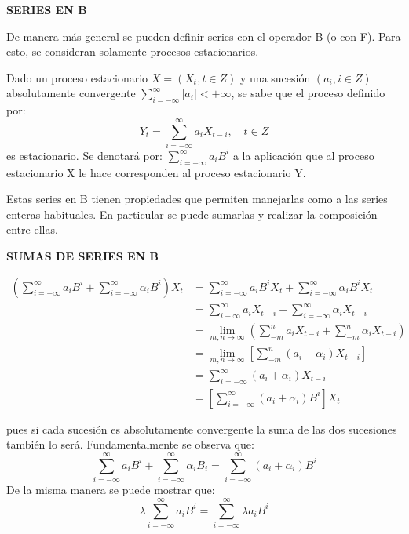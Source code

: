 \textbf{SERIES EN B}\newline

De manera m\'{a}s general se pueden definir series con el operador B (o con F). Para esto, se consideran solamente procesos estacionarios.\newline

Dado un proceso estacionario $X=\left(X_{t}, t\in Z \right)$ y una sucesi\'{o}n $\left(a_{i}, i\in Z \right)$ absolutamente convergente $\sum_{i=-\infty }^\infty \left|a_{i}\right| <+\infty$, se sabe que el proceso definido por:
\[
Y_{t} =\sum\limits_{i=-\infty }^\infty a_{i} X_{t-i},\quad t\in Z
\]
es estacionario. Se denotar\'{a} por: $\sum\limits_{i=-\infty}^{\infty} a_{i} B^{i}$ a la aplicaci\'{o}n que al proceso estacionario X le hace corresponden al proceso estacionario Y.\newline

Estas series en B tienen propiedades que permiten manejarlas como a las series enteras habituales. En particular se puede sumarlas y realizar la composici\'{o}n entre ellas.\newline

\textbf{SUMAS DE SERIES EN B}

\begin{align*}
\left(\sum\limits_{i=-\infty}^{\infty} a_{i}B^{i}+\sum\limits_{i=-\infty}^{\infty} \alpha_{i} B^{i} \right)X_{t} &=\sum\limits_{i=-\infty }^{\infty} a_{i}B^{i} X_{t} +\sum\limits_{i=-\infty}^{\infty} \alpha_{i}B^{i}X_{t}\\
      &= \sum\limits_{i-\infty}^{\infty} a_{i} X_{t-i} +\sum\limits_{i=-\infty}^{\infty} \alpha_{i} X_{t-i}\\
      &= \lim\limits_{m,n\to \infty} \left(\sum\limits_{-m}^{n} a_{i}X_{t-i} +\sum\limits_{-m}^{n} \alpha_{i} X_{t-i} \right) \\ 
      &= \lim\limits_{m,n\to \infty} \left[\sum\limits_{-m}^{n} \left(a_{i} +\alpha_{i} \right)X_{t-i}\right] \\ 
      &= \sum\limits_{i=-\infty}^{\infty} \left(a_{i} +\alpha_{i} \right)X_{t-i} \\ 
      &= \left[\sum\limits_{i=-\infty}^{\infty} \left( a_{i} +\alpha_{i}\right)B^{i} \right]X_{t}
\end{align*}

pues si cada sucesi\'{o}n es absolutamente convergente la suma de las dos sucesiones tambi\'{e}n lo ser\'{a}. Fundamentalmente se observa que:
\[
\sum\limits_{i=-\infty}^{\infty} a_{i}B^{i}+\sum\limits_{i=-\infty}^{\infty} \alpha_{i}B_{i} =\sum\limits_{i=-\infty}^{\infty} \left(a_{i} +\alpha_{i} \right)B^{i}
\]
De la misma manera se puede mostrar que:
\[
\lambda \sum\limits_{i=-\infty}^{\infty} a_{i}B^{i}= \sum\limits_{i=-\infty}^{\infty} \lambda a_{i}B^{i}
\]

